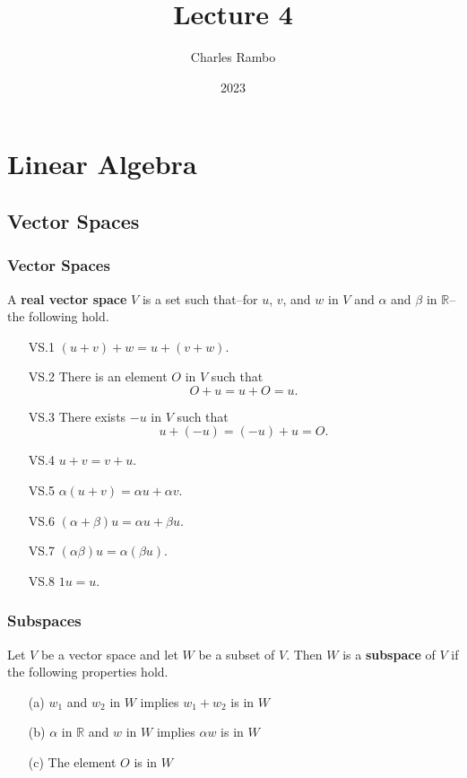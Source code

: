 \documentclass{beamer}
\title{Lecture 4}
\author{Charles Rambo}
\institute{UCLA Anderson School of Management}
\date{2023}
\begin{document}
\insertTitleSlide

\section{Linear Algebra}
\subsection{Vector Spaces}

\begin{frame}
\frametitle{Vector Spaces}
\begin{Definition}
A {\bf real vector space} $V$ is a set such that--for $u$, $v$, and $w$ in $V$ and $\alpha$ and $\beta$ in $\mathbb{R}$--the following hold.
{
\small
\begin{multicols}{2}
\begin{enumerate}
\item[VS.1] $(u + v) + w = u + (v + w)$.
\item[VS.2] There is an element $O$ in $V$ such that
$$
O + u = u + O = u.
$$
\item[VS.3] There exists $-u$ in $V$ such that
$$
u + (-u) = (-u) + u = O.
$$
\item[VS.4] $u + v = v + u$.
\item[VS.5] $\alpha(u + v) = \alpha u + \alpha v$.
\item[VS.6] $(\alpha + \beta) u = \alpha u + \beta u$.
\item[VS.7] $(\alpha\beta) u = \alpha(\beta u)$.
\item[VS.8] $1 u = u$.
\end{enumerate}
\end{multicols}
}
\end{Definition}
\end{frame}

\begin{frame}
\frametitle{Subspaces}
\begin{Definition}
Let $V$ be a vector space and let $W$ be a subset of $V$. Then $W$ is a {\bf subspace} of $V$ if the following properties hold.
\begin{enumerate}
\item[(a)] $w_1$ and $w_2$ in $W$ implies $w_1 + w_2$ is in $W$
\item[(b)] $\alpha$ in $\mathbb{R}$ and $w$ in $W$ implies $\alpha w$ is in $W$
\item[(c)] The element $O$ is in $W$
\end{enumerate}
\end{Definition}

\end{frame}
\end{document}
